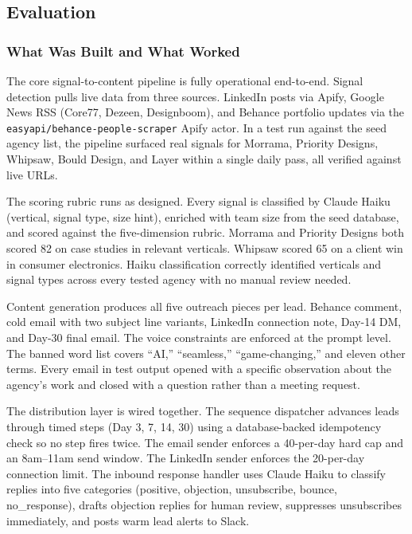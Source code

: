 \documentclass[11pt, letterpaper]{article}
\begin{document}
\subsection{Evaluation}

\subsubsection{What Was Built and What Worked}

The core signal-to-content pipeline is fully operational end-to-end. Signal
detection pulls live data from three sources. LinkedIn posts via Apify, Google
News RSS (Core77, Dezeen, Designboom), and Behance portfolio updates via the
\texttt{easyapi/behance-people-scraper} Apify actor. In a test run against the
seed agency list, the pipeline surfaced real signals for Morrama, Priority
Designs, Whipsaw, Bould Design, and Layer within a single daily pass, all
verified against live URLs.

The scoring rubric runs as designed. Every signal is classified by Claude Haiku
(vertical, signal type, size hint), enriched with team size from the seed
database, and scored against the five-dimension rubric. Morrama and Priority
Designs both scored 82 on case studies in relevant verticals. Whipsaw scored 65
on a client win in consumer electronics. Haiku classification correctly
identified verticals and signal types across every tested agency with no
manual review needed.

Content generation produces all five outreach pieces per lead. Behance comment,
cold email with two subject line variants, LinkedIn connection note, Day-14 DM,
and Day-30 final email. The voice constraints are enforced at the prompt level.
The banned word list covers ``AI,'' ``seamless,'' ``game-changing,'' and
eleven other terms. Every email in test output opened with a specific
observation about the agency's work and closed with a question rather than a
meeting request.

The distribution layer is wired together. The sequence dispatcher advances
leads through timed steps (Day 3, 7, 14, 30) using a database-backed idempotency
check so no step fires twice. The email sender enforces a 40-per-day hard cap
and an 8am--11am send window. The LinkedIn sender enforces the 20-per-day
connection limit. The inbound response handler uses Claude Haiku to classify
replies into five categories (positive, objection, unsubscribe, bounce,
no\_response), drafts objection replies for human review, suppresses
unsubscribes immediately, and posts warm lead alerts to Slack.
\end{document}
